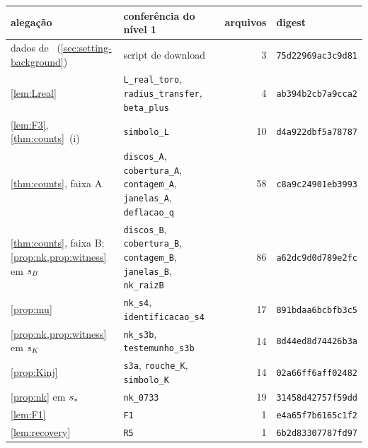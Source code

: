 \begin{tabular}{@{}p{}p{}rl@{}}
\toprule
alegação & conferência do nível 1 & arquivos & digest \\
\midrule
dados de~\cite{RT2019} (\cref{sec:setting-background}) & script de download & 3 & \texttt{75d22969ac3c9d81} \\
\cref{lem:Lreal} & \texttt{L\_real\_toro}, \texttt{radius\_transfer}, \texttt{beta\_plus} & 4 & \texttt{ab394b2cb7a9cca2} \\
\cref{lem:F3}, \cref{thm:counts}~(i) & \texttt{simbolo\_L} & 10 & \texttt{d4a922dbf5a78787} \\
\cref{thm:counts}, faixa A & \texttt{discos\_A}, \texttt{cobertura\_A}, \texttt{contagem\_A}, \texttt{janelas\_A}, \texttt{deflacao\_q} & 58 & \texttt{c8a9c24901eb3993} \\
\cref{thm:counts}, faixa B; \cref{prop:nk,prop:witness} em $s_{B}$ & \texttt{discos\_B}, \texttt{cobertura\_B}, \texttt{contagem\_B}, \texttt{janelas\_B}, \texttt{nk\_raizB} & 86 & \texttt{a62dc9d0d789e2fc} \\
\cref{prop:mu} & \texttt{nk\_s4}, \texttt{identificacao\_s4} & 17 & \texttt{891bdaa6bcbfb3c5} \\
\cref{prop:nk,prop:witness} em $s_{K}$ & \texttt{nk\_s3b}, \texttt{testemunho\_s3b} & 14 & \texttt{8d44ed8d74426b3a} \\
\cref{prop:Kinj} & \texttt{s3a}, \texttt{rouche\_K}, \texttt{simbolo\_K} & 14 & \texttt{02a66ff6aff02482} \\
\cref{prop:nk} em $s_{\ast}$ & \texttt{nk\_0733} & 19 & \texttt{31458d42757f59dd} \\
\cref{lem:F1} & \texttt{F1} & 1 & \texttt{e4a65f7b6165c1f2} \\
\cref{lem:recovery} & \texttt{R5} & 1 & \texttt{6b2d83307787fd97} \\
\bottomrule
\end{tabular}
